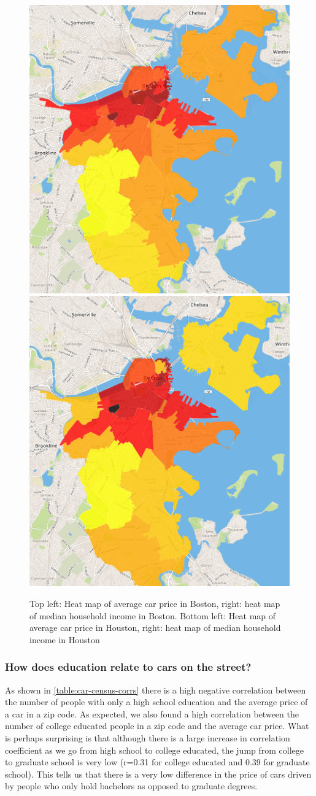 \documentclass[10pt,twocolumn,letterpaper]{article}
\begin{document}
\begin{figure}[t]
\begin{center}
    \includegraphics[width=0.45\linewidth]{img/price.png}
    \includegraphics[width=0.45\linewidth]{img/income.png}
\end{center}
   \caption {Top left: Heat map of average car price in Boston, right: heat map of median household income in Boston. Bottom left: Heat map of average car price in Houston, right: heat map of median household income in Houston}
\label{fig:bos-sf-vis}
\end{figure}

\subsubsection{How does education relate to cars on the street?}
As shown in \ref{table:car-census-corrs} there is a high negative correlation between the number of people with only a high school education and the average price of a car in a zip code. As expected, we also found a high correlation between the number of college educated people in a zip code and the average car price. What is perhaps surprising is that although there is a large increase in correlation coefficient as we go from high school to college educated, the jump from college to graduate school is very low (r=0.31 for college educated and 0.39 for graduate school). This tells us that there is a very low difference in the price of cars driven by people who only hold bachelors as opposed to graduate degrees.
\end{document}
